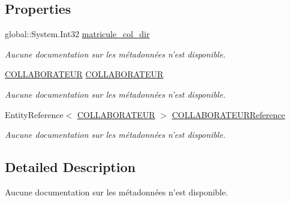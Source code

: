 \subsection*{Properties}
\begin{DoxyCompactItemize}
\item 
global\-::\-System.\-Int32 \hyperlink{class_model_1_1_d_i_r_e_c_t_e_u_r___r_e_g_i_o_n_a_l_af8f929e9e0dd4f9a73d90d9f234a83d2}{matricule\-\_\-col\-\_\-dir}
\begin{DoxyCompactList}\small\item\em Aucune documentation sur les métadonnées n'est disponible. \end{DoxyCompactList}\item 
\hyperlink{class_model_1_1_c_o_l_l_a_b_o_r_a_t_e_u_r}{C\-O\-L\-L\-A\-B\-O\-R\-A\-T\-E\-U\-R} \hyperlink{class_model_1_1_d_i_r_e_c_t_e_u_r___r_e_g_i_o_n_a_l_ab521033cf2f8ba34d4f8ac689c716eef}{C\-O\-L\-L\-A\-B\-O\-R\-A\-T\-E\-U\-R}
\begin{DoxyCompactList}\small\item\em Aucune documentation sur les métadonnées n'est disponible. \end{DoxyCompactList}\item 
Entity\-Reference$<$ \hyperlink{class_model_1_1_c_o_l_l_a_b_o_r_a_t_e_u_r}{C\-O\-L\-L\-A\-B\-O\-R\-A\-T\-E\-U\-R} $>$ \hyperlink{class_model_1_1_d_i_r_e_c_t_e_u_r___r_e_g_i_o_n_a_l_a17398b2802e5c114de482c1ca1ab77a8}{C\-O\-L\-L\-A\-B\-O\-R\-A\-T\-E\-U\-R\-Reference}
\begin{DoxyCompactList}\small\item\em Aucune documentation sur les métadonnées n'est disponible. \end{DoxyCompactList}\end{DoxyCompactItemize}


\subsection{Detailed Description}
Aucune documentation sur les métadonnées n'est disponible. 



